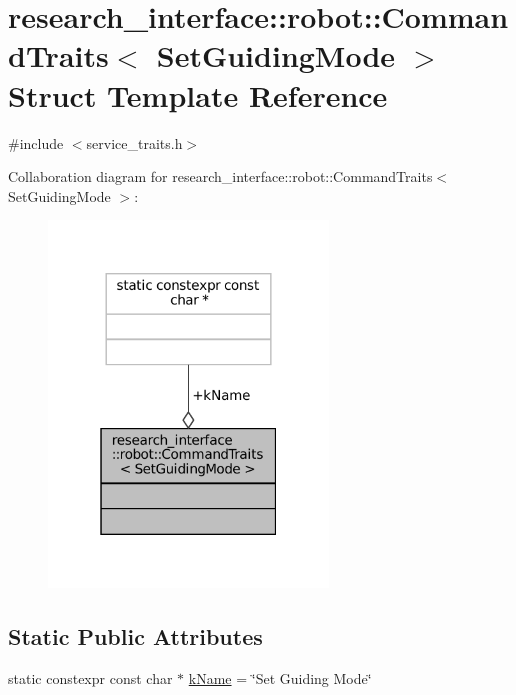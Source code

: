 \hypertarget{structresearch__interface_1_1robot_1_1CommandTraits_3_01SetGuidingMode_01_4}{}\section{research\+\_\+interface\+:\+:robot\+:\+:Command\+Traits$<$ Set\+Guiding\+Mode $>$ Struct Template Reference}
\label{structresearch__interface_1_1robot_1_1CommandTraits_3_01SetGuidingMode_01_4}


{\ttfamily \#include $<$service\+\_\+traits.\+h$>$}



Collaboration diagram for research\+\_\+interface\+:\+:robot\+:\+:Command\+Traits$<$ Set\+Guiding\+Mode $>$\+:
\nopagebreak
\begin{figure}[H]
\begin{center}
\leavevmode
\includegraphics[width=211pt]{structresearch__interface_1_1robot_1_1CommandTraits_3_01SetGuidingMode_01_4__coll__graph}
\end{center}
\end{figure}
\subsection*{Static Public Attributes}
\begin{DoxyCompactItemize}
\item 
static constexpr const char $\ast$ \hyperlink{structresearch__interface_1_1robot_1_1CommandTraits_3_01SetGuidingMode_01_4_a567f1f1b2f1cfb58e3b87173eb31adeb}{k\+Name} = \char`\"{}Set Guiding Mode\char`\"{}
\end{DoxyCompactItemize}


